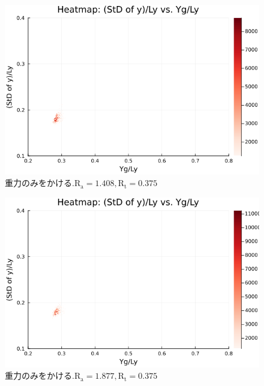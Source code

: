 \begin{figure}[H]
  \centering
  \includegraphics[scale=0.6]{image/dT0_heat/2024-01-15T14:30:48.081_mapg0_chi0_Ay50_rho0.4_T0.43_dT0.0_Rd0.0_Rt0.375_Ra1.4081535_g0.0003999718779659611_run4.0e7.png}
  \caption{$重力のみをかける. \text{R}_\text{a}=1.408,\text{R}_\text{t}=0.375$}
  \label{}
\end{figure}

\begin{figure}[H]
  \centering
  \includegraphics[scale=0.6]{image/dT0_heat/2024-01-15T14:30:48.147_mapg0_chi0_Ay50_rho0.4_T0.43_dT0.0_Rd0.0_Rt0.375_Ra1.877538_g0.0003999718779659611_run4.0e7.png}
  \caption{$重力のみをかける. \text{R}_\text{a}=1.877,\text{R}_\text{t}=0.375$}
  \label{}
\end{figure}

